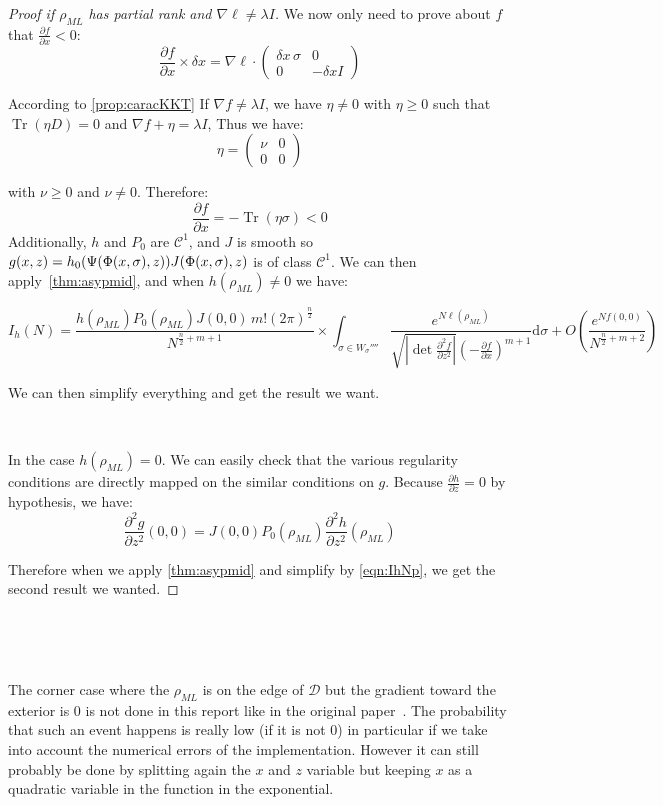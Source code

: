 \documentclass[10pt,a4paper]{report}
\theoremstyle{plain}
\theoremstyle{definition}
\theoremstyle{remark}
\newcommand{\dd}{\mathrm{d}}
\newcommand{\dpar}[2]{\frac{\partial{#1}}{\partial{#2}}}
\newcommand{\dparn}[3]{\frac{\partial^{#3} {#1}}{\partial{#2}^{#3}}}
\renewcommand{\geq}{\geqslant}
\newcommand{\mat}[1]{\begin{pmatrix}#1\end{pmatrix}}
\DeclareMathOperator{\Tr}{Tr}
\newcommand{\class}[1]{{\mathscr{C}^{#1}}}
\newcommand{\ml}{_{M\!L}}
\begin{document}
\begin{proof}[Proof if $\rho\ml$ has partial rank and $\nabla \ell \neq \lambda I$]
  We now only need to prove about $f$ that $\dpar f x < 0$:
  \[\dpar f x \times \delta x = \nabla \ell \cdot \mat{\delta x\, \sigma & 0\\0 &-
      \delta x I} \]

  According to \cref{prop:caracKKT} If $\nabla f \neq \lambda I$, we have $\eta
  \neq 0$ with $\eta \geq 0$ such that $\Tr(\eta D) = 0$ and $\nabla f + \eta =
  \lambda I$, Thus we have:
  \[\eta = \mat{\nu&0\\0&0}\]

  with $\nu \geq 0$ and $\nu \neq 0$. Therefore:
  \[\dpar f x = - \Tr(\eta\sigma) <0\]
  Additionally, $h$ and $P_0$ are $\class 1$, and $J$ is smooth so $g(x,z) =
  h_0(\Psi(\Phi(x,\sigma),z))J(\Phi(x,\sigma),z)$ is of class $\class 1$. We can then
  apply~\cref{thm:asypmid}, and when $h(\rho\ml) \neq 0$ we have:

  \begin{equation}\label{eqn:IhNp}
    I_h(N) =
    \frac{h(\rho\ml)P_0(\rho\ml)J(0,0)\,m! {(2\pi)}^{\frac n 2}}{N^{\frac n 2 + m + 1}} \times
    \int_{\sigma \in W_\sigma''''}\frac{e^{N\ell(\rho\ml)}}
    {\sqrt{\left|\det \dparn f z 2\right|} \left(-\dpar f x\right)^{m+1}} \dd \sigma
    + O\left(\frac{e^{Nf(0,0)}}{N^{\frac n 2 + m + 2}}\right)
  \end{equation}

  We can then simplify everything and get the result we want.

  \

  In the case $h(\rho\ml) = 0$. We can easily check that the various regularity conditions
  are directly mapped on the similar conditions on $g$. Because $\dpar h z = 0$
  by hypothesis, we have:
  \[\dparn g z 2(0,0) = J(0,0)P_0(\rho\ml) \dparn h z 2 (\rho\ml)\]

  Therefore when we apply \cref{thm:asypmid} and simplify by \cref{eqn:IhNp},
  we get the second result we wanted.
\end{proof}


\

\

The corner case where the $\rho\ml$ is on the edge of $\mathcal{D}$ but the
gradient toward the exterior is 0 is not done in this report like in the original
paper~\cite{SPRAL17}. The probability that such an event happens is really low
(if it is not 0) in particular if we take into account the numerical errors of
the implementation. However it can still probably be done by splitting again the
$x$ and $z$ variable but keeping $x$ as a quadratic variable in the function in
the exponential.
\end{document}
